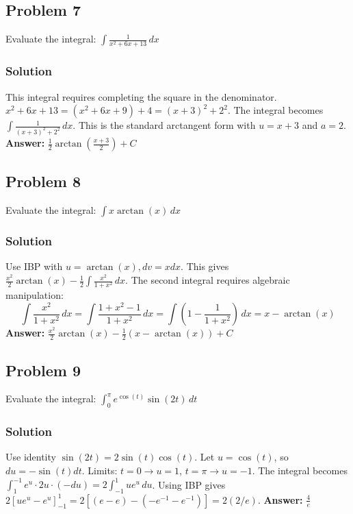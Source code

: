 \documentclass{article}
\begin{document}
\subsection{Problem 7}
Evaluate the integral: $ \int \frac{1}{x^2 + 6x + 13} \,dx $
\subsubsection*{Solution}
This integral requires completing the square in the denominator.
$ x^2 + 6x + 13 = (x^2 + 6x + 9) + 4 = (x+3)^2 + 2^2 $.
The integral becomes $ \int \frac{1}{(x+3)^2 + 2^2} \,dx $.
This is the standard arctangent form with $u=x+3$ and $a=2$.
\textbf{Answer:} $ \frac{1}{2}\arctan\left(\frac{x+3}{2}\right) + C $


\subsection{Problem 8}
Evaluate the integral: $ \int x \arctan(x) \,dx $
\subsubsection*{Solution}
Use IBP with $u=\arctan(x), dv=x dx$. This gives $\frac{x^2}{2}\arctan(x) - \frac{1}{2} \int \frac{x^2}{1+x^2} \,dx$.
The second integral requires algebraic manipulation:
\[ \int \frac{x^2}{1+x^2} \,dx = \int \frac{1+x^2-1}{1+x^2} \,dx = \int \left(1 - \frac{1}{1+x^2}\right) \,dx = x - \arctan(x) \]
\textbf{Answer:} $ \frac{x^2}{2}\arctan(x) - \frac{1}{2}(x - \arctan(x)) + C $


\subsection{Problem 9}
Evaluate the integral: $ \int_{0}^{\pi} e^{\cos(t)} \sin(2t) \,dt $
\subsubsection*{Solution}
Use identity $\sin(2t) = 2\sin(t)\cos(t)$. Let $u=\cos(t)$, so $du=-\sin(t)dt$.
Limits: $t=0 \to u=1$, $t=\pi \to u=-1$.
The integral becomes $ \int_{1}^{-1} e^u \cdot 2u \cdot (-du) = 2\int_{-1}^{1} u e^u \,du $.
Using IBP gives $ 2[ue^u - e^u]_{-1}^{1} = 2[(e-e) - (-e^{-1} - e^{-1})] = 2(2/e) $.
\textbf{Answer:} $ \frac{4}{e} $


\end{document}
